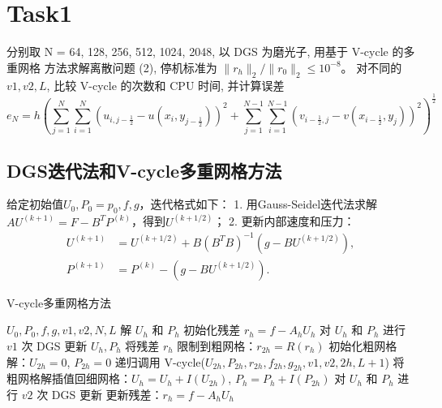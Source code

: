 \documentclass{article}
\begin{document}
\section{Task1}

分别取 N = 64, 128, 256, 512, 1024, 2048, 以 DGS 为磨光子, 用基于 V-cycle 的多重网格
方法求解离散问题 (2), 停机标准为 $\|r_h\|_{2} / \|r_{0}\|_{2} \leq 10^{-8}$。
对不同的 $v1,v2,L$, 比较 V-cycle 的次数和 CPU 时间, 并计算误差
$$
e_{N} = h \left( \sum_{j=1}^{N} \sum_{i=1}^{N} \left( u_{i,j-\frac{1}{2}} - u(x_i,y_{j-\frac{1}{2}}) \right)^{2} + \sum_{j=1}^{N-1} \sum_{i=1}^{N-1} \left( v_{i-\frac{1}{2},j} - v(x_{i-\frac{1}{2}},y_j) \right)^{2} \right)^{\frac{1}{2}}
$$

\subsection{DGS迭代法和V-cycle多重网格方法}
给定初始值$U_0,P_0 = p_0,f,g$，迭代格式如下：
1. 用Gauss-Seidel迭代法求解$AU^{(k+1)} = F - B^{T}P^{(k)}$，得到$U^{(k+1/2)}$；
2. 更新内部速度和压力：
\begin{equation}
  \begin{aligned}
    U^{(k+1)} &= U^{(k+1/2)} + B (B^T B)^{-1} (g - B U^{(k+1/2)}), \\
    P^{(k+1)} &= P^{(k)} - (g - B U^{(k+1/2)}).
  \end{aligned}
\end{equation}

\begin{algorithm}
  \caption{V-cycle多重网格方法}
  \begin{algorithmic}[1]
    \Require $U_0, P_0, f, g, v1, v2, N, L$
    \Ensure 解 $U_h$ 和 $P_h$
    \State 初始化残差 $r_h = f - A_h U_h$
      \State 对 $U_h$ 和 $P_h$ 进行 $v1$ 次 DGS 更新
        \State \Return $U_h, P_h$
      \Else
        \State 将残差 $r_h$ 限制到粗网格：$r_{2h} = R(r_h)$
        \State 初始化粗网格解：$U_{2h} = 0$, $P_{2h} = 0$
        \State 递归调用 V-cycle($U_{2h}, P_{2h}, r_{2h}, f_{2h}, g_{2h}, v1, v2, 2h, L+1$)
        \State 将粗网格解插值回细网格：$U_h = U_h + I(U_{2h})$, $P_h = P_h + I(P_{2h})$
      \EndIf
      \State 对 $U_h$ 和 $P_h$ 进行 $v2$ 次 DGS 更新
      \State 更新残差：$r_h = f - A_h U_h$
    \EndWhile
  \end{algorithmic}
\end{algorithm}
\end{document}
